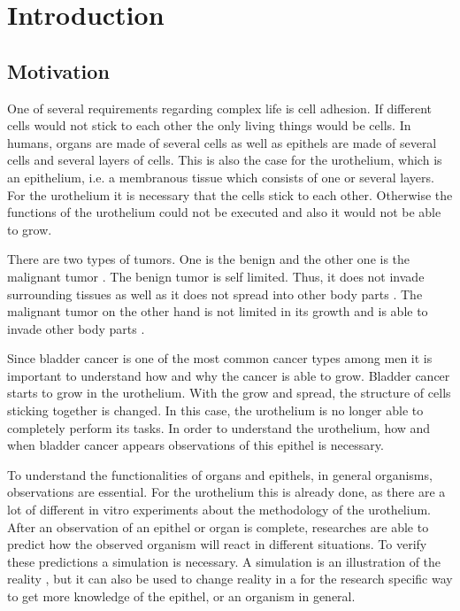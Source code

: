 \chapter{Introduction}
\section{Motivation}
One of several requirements regarding complex life is cell adhesion. If different cells would not stick to each other the only living things would be cells. 
In humans, organs are made of several cells as well as epithels are made of several cells and several layers of cells. This is also the case for the urothelium, which is an epithelium, i.e. a membranous tissue which consists of one or several layers. For the urothelium it is necessary that the cells stick to each other. Otherwise the functions of the urothelium could not be executed and also it would not be able to grow.%

There are two types of tumors. One is the benign and the other one is the malignant tumor \cite{Poplawski2009}. The benign tumor is self limited. Thus, it does not invade surrounding tissues as well as it does not spread into other body parts \cite{Poplawski2009}. The malignant tumor on the other hand is not limited in its growth and is able to invade other body parts \cite{Poplawski2009}. 

Since bladder cancer is one of the most common cancer types among men it is important to understand how and why the cancer is able to grow. \newline
Bladder cancer starts to grow in the urothelium. With the grow and spread, the structure of cells sticking together is changed. In this case, the urothelium is no longer able to completely perform its tasks. In order to understand the urothelium, how and when bladder cancer appears observations of this epithel is necessary. 

To understand the functionalities of organs and epithels, in general organisms, observations are essential. For the urothelium this is already done, as there are a lot of different in vitro experiments about the methodology of the urothelium. After an observation of an epithel or organ is complete, researches are able to predict how the observed organism will react in different situations. To verify these predictions a simulation is necessary. A simulation is an illustration of the reality \cite{REF}, but it can also be used to change reality in a for the research specific way to get more knowledge of the epithel, or an organism in general.


